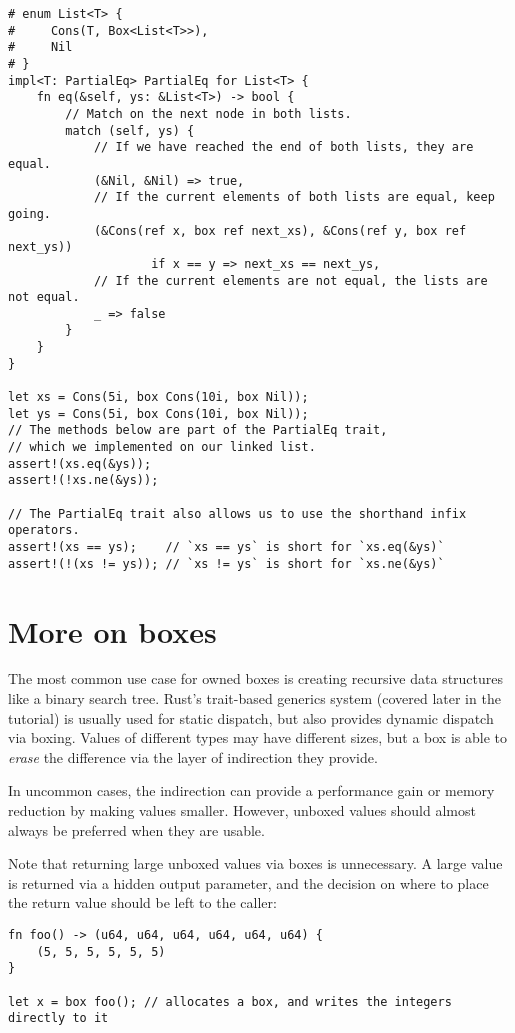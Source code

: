 \documentclass[]{article}
\begin{document}
\begin{verbatim}
# enum List<T> {
#     Cons(T, Box<List<T>>),
#     Nil
# }
impl<T: PartialEq> PartialEq for List<T> {
    fn eq(&self, ys: &List<T>) -> bool {
        // Match on the next node in both lists.
        match (self, ys) {
            // If we have reached the end of both lists, they are equal.
            (&Nil, &Nil) => true,
            // If the current elements of both lists are equal, keep going.
            (&Cons(ref x, box ref next_xs), &Cons(ref y, box ref next_ys))
                    if x == y => next_xs == next_ys,
            // If the current elements are not equal, the lists are not equal.
            _ => false
        }
    }
}

let xs = Cons(5i, box Cons(10i, box Nil));
let ys = Cons(5i, box Cons(10i, box Nil));
// The methods below are part of the PartialEq trait,
// which we implemented on our linked list.
assert!(xs.eq(&ys));
assert!(!xs.ne(&ys));

// The PartialEq trait also allows us to use the shorthand infix operators.
assert!(xs == ys);    // `xs == ys` is short for `xs.eq(&ys)`
assert!(!(xs != ys)); // `xs != ys` is short for `xs.ne(&ys)`
\end{verbatim}

\section{More on boxes}\label{more-on-boxes}

The most common use case for owned boxes is creating recursive data
structures like a binary search tree. Rust's trait-based generics system
(covered later in the tutorial) is usually used for static dispatch, but
also provides dynamic dispatch via boxing. Values of different types may
have different sizes, but a box is able to \emph{erase} the difference
via the layer of indirection they provide.

In uncommon cases, the indirection can provide a performance gain or
memory reduction by making values smaller. However, unboxed values
should almost always be preferred when they are usable.

Note that returning large unboxed values via boxes is unnecessary. A
large value is returned via a hidden output parameter, and the decision
on where to place the return value should be left to the caller:

\begin{verbatim}
fn foo() -> (u64, u64, u64, u64, u64, u64) {
    (5, 5, 5, 5, 5, 5)
}

let x = box foo(); // allocates a box, and writes the integers directly to it
\end{verbatim}
\end{document}
